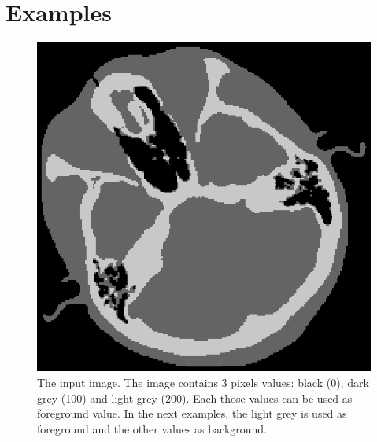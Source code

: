 \documentclass{InsightArticle}
\begin{document}
\section{Examples}

\begin{figure}[b]
\centering
\includegraphics{2th_cthead1.eps}
\caption{The input image. The image contains 3 pixels values: black (0), dark grey (100) and light grey (200). Each those values can be used as foreground value. In the next examples, the light grey is used as foreground and the other values as background.}
\end{figure}
\end{document}
